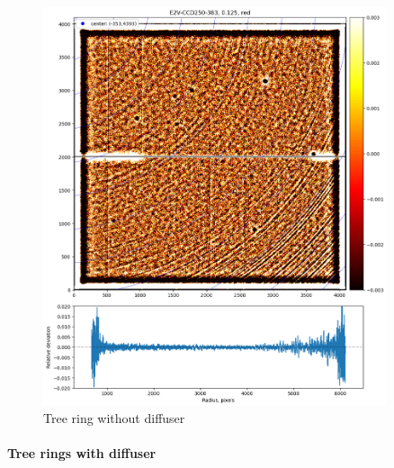 \begin{figure}
\begin{centering}
\includegraphics[width=0.9\textwidth]{figures/TR_wo_diffuser.png}
\end{centering}
\caption{Tree ring without diffuser}
\end{figure}

\paragraph{Tree rings with diffuser}

